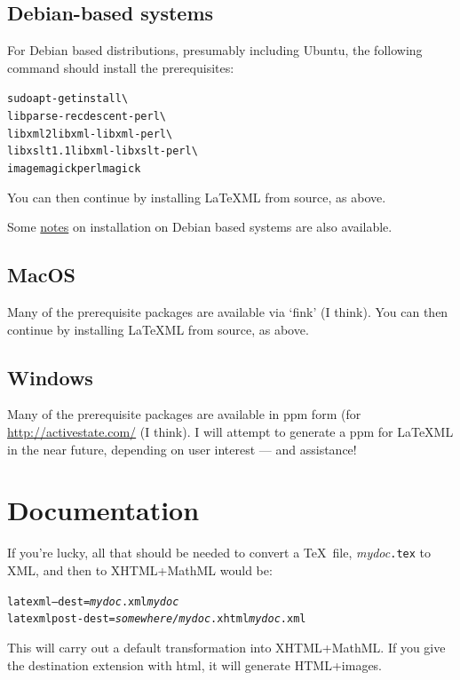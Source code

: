 \documentclass{article}
\begin{document}
\subsection{Debian-based systems}
For Debian based distributions, presumably including Ubuntu, the following
command  should install the prerequisites:
\begin{alltt}
   sudo apt-get install   \textbackslash\\
      libparse-recdescent-perl \textbackslash\\
      libxml2 libxml-libxml-perl \textbackslash\\
      libxslt1.1 libxml-libxslt-perl  \textbackslash\\
      imagemagick perlmagick
\end{alltt}
You can then continue by installing LaTeXML from source, as above.

Some \href{http://rhaptos.org/devblog/reedstrm/latexml}{notes} on installation on Debian
based systems are also available.

\subsection{MacOS}
Many of the prerequisite packages are available via `fink' (I think).
You can then continue by installing LaTeXML from source, as above.

\subsection{Windows}
Many of the prerequisite packages are available in
ppm form (for \href{ActivePerl}{http://activestate.com/} (I think).
I will attempt to generate a ppm for LaTeXML in the near
future, depending on user interest --- and assistance!

\section{Documentation}\label{docs}
If you're lucky, all that should be needed to convert
a \TeX\ file, \textit{mydoc}\texttt{.tex} to XML, and
then to XHTML+MathML would be:
\begin{alltt}
   latexml --dest=\textit{mydoc}.xml \textit{mydoc}
   latexmlpost -dest=\textit{somewhere/mydoc}.xhtml \textit{mydoc}.xml
\end{alltt}
This will carry out a default transformation into XHTML+MathML.  If you
give the destination extension with html, it will generate HTML+images.
\end{document}
